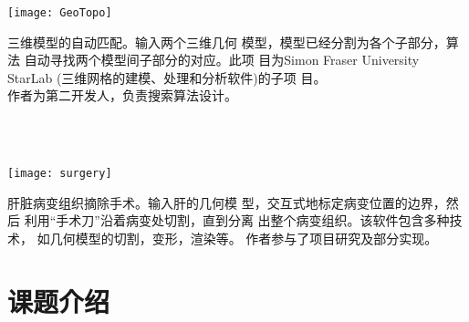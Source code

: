 \documentclass[20pt]{article} %
\begin{document}
\begin{minipage}{0.5\textwidth}
{
\center
  \texttt{[image: GeoTopo]}
}
\end{minipage}
\begin{minipage}{0.5\textwidth}
三维模型的自动匹配。输入两个三维几何
模型，模型已经分割为各个子部分，算法
自动寻找两个模型间子部分的对应。此项
目为{Simon Fraser University StarLab}
(三维网格的建模、处理和分析软件)的子项
目。\\
作者为第二开发人，负责搜索算法设计。
\end{minipage}
\\
\\


\begin{minipage}{0.5\textwidth}
{
\center
  \texttt{[image: surgery]}
}
\end{minipage}
\begin{minipage}{0.5\textwidth}
肝脏病变组织摘除手术。输入肝的几何模
型，交互式地标定病变位置的边界，然后
利用“手术刀”沿着病变处切割，直到分离
出整个病变组织。该软件包含多种技术，
如几何模型的切割，变形，渲染等。
作者参与了项目研究及部分实现。
\end{minipage}

\section{课题介绍}
\end{document}
